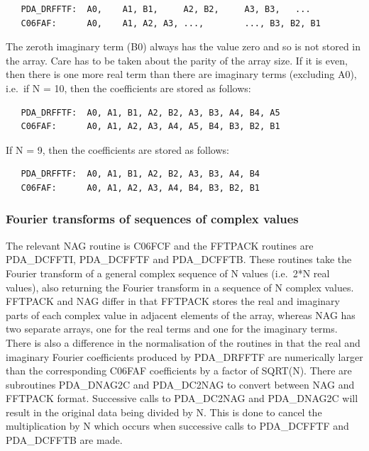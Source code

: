 \documentclass[11pt,twoside]{article}
\newcommand{\htmlref}[2]{#1}
\newcommand{\xlabel}[1]{}
\begin{document}
\begin{verbatim}
   PDA_DRFFTF:  A0,    A1, B1,     A2, B2,     A3, B3,   ...
   C06FAF:      A0,    A1, A2, A3, ...,        ..., B3, B2, B1
\end{verbatim}

   The zeroth imaginary term (B0) always has the value zero and so is
   not stored in the array. Care has to be taken about the parity of the
   array size. If it is even, then there is one more real term than
   there are imaginary terms (excluding A0), i.e.\ if N = 10, then the
   coefficients are stored as follows:

\begin{verbatim}
   PDA_DRFFTF:  A0, A1, B1, A2, B2, A3, B3, A4, B4, A5
   C06FAF:      A0, A1, A2, A3, A4, A5, B4, B3, B2, B1
\end{verbatim}

   If N = 9, then the coefficients are stored as follows:

\begin{verbatim}
   PDA_DRFFTF:  A0, A1, B1, A2, B2, A3, B3, A4, B4
   C06FAF:      A0, A1, A2, A3, A4, B4, B3, B2, B1
\end{verbatim}


\subsubsection{\xlabel{fourier_transforms_of_sequences_of_complex_values}Fourier transforms of sequences of complex values}

   The relevant NAG routine is C06FCF and the FFTPACK routines are
   PDA\_DCFFTI, PDA\_\-DCFFTF and PDA\_DCFFTB. These routines take the Fourier transform
   of a general complex sequence of N values (i.e.\ 2*N real values),
   also returning the Fourier transform in a sequence of N complex
   values. FFTPACK and NAG differ in that FFTPACK stores the real and
   imaginary parts of each complex value in adjacent elements of the
   array, whereas NAG has two separate arrays, one for the real terms
   and one for the imaginary terms. There is also a difference in the
   normalisation of the routines in that the real and imaginary Fourier
   coefficients produced by PDA\_DRFFTF are numerically larger than the
   corresponding C06FAF coefficients by a factor of SQRT(N). There are
   subroutines
\htmlref{PDA\_DNAG2C}{PDA\_NAG2C} and 
\htmlref{PDA\_DC2NAG}{PDA\_C2NAG}
   to convert between NAG and FFTPACK format. Successive calls to
   PDA\_DC2NAG and PDA\_DNAG2C will result in the original data being divided by
   N. This is done to cancel the multiplication by N which occurs when
   successive calls to PDA\_DCFFTF and PDA\_DCFFTB are made.
\end{document}
